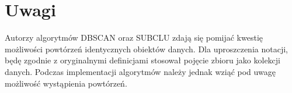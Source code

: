 \section{Uwagi}
Autorzy algorytmów DBSCAN \cite{dbscan} oraz SUBCLU \cite{subclu} zdają się pomijać kwestię możliwości powtórzeń identycznych obiektów danych. Dla uproszczenia notacji, będę zgodnie z oryginalnymi definicjami stosował pojęcie zbioru jako kolekcji danych. Podczas implementacji algorytmów należy jednak wziąć pod uwagę możliwość wystąpienia powtórzeń.